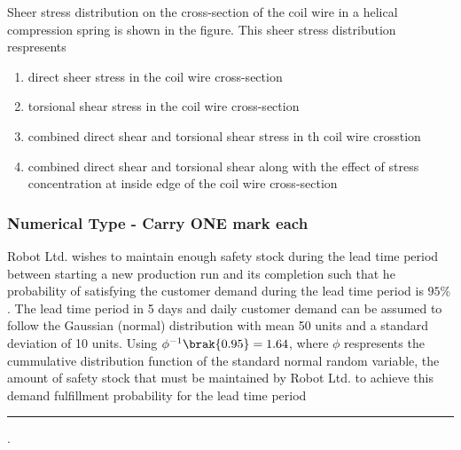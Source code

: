 	\item Sheer stress distribution on the cross-section of the coil wire in a helical compression spring is shown in the figure. This sheer stress distribution respresents
		
		\begin{figure}[H]
                \centering    
                \end{figure} 

		\hfill{}

		\begin{enumerate}
			\item direct sheer stress in the coil wire cross-section 
			\item torsional shear stress in the coil wire cross-section
			\item combined direct shear and torsional shear stress in th coil wire crosstion
			\item combined direct shear and torsional shear along with the effect of stress concentration at inside edge of the coil wire cross-section
		\end{enumerate}
\subsubsection{Numerical Type - Carry ONE mark each}
	\item Robot Ltd. wishes to maintain enough safety stock during the lead time period between starting a new production run and its completion such that he probability of satisfying the customer demand during the lead time period is $95\%$. The lead time period in 5 days and daily customer demand can be assumed to follow the Gaussian (normal) distribution with mean 50 units and a standard deviation of 10 units. Using $\phi^{-1}\brak{0.95} = 1.64$, where $\phi$ respresents the cummulative distribution function of the standard normal random variable, the amount of safety stock that must be maintained by Robot Ltd. to achieve this demand fulfillment probability for the lead time period \rule{2cm}{0.1pt} .

